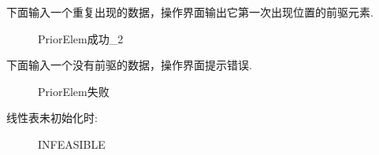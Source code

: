 \documentclass[supercite]{Experimental_Report}
\theoremstyle{definition}
\begin{document}
\noindent
下面输入一个重复出现的数据，操作界面输出它第一次出现位置的前驱元素.
\begin{figure}[htbp]
	\centering
	\centering
	\caption{PriorElem成功\_2}
	\label{fig1-33}
\end{figure}

\noindent
下面输入一个没有前驱的数据，操作界面提示错误.
\begin{figure}[htbp]
	\centering
	\centering
	\caption{PriorElem失败}
	\label{fig1-34}
\end{figure}

\clearpage
\noindent
线性表未初始化时:
\begin{figure}[htbp]
	\centering
	\centering
	\caption{INFEASIBLE}
	\label{fig1-35}
\end{figure}
\end{document}
